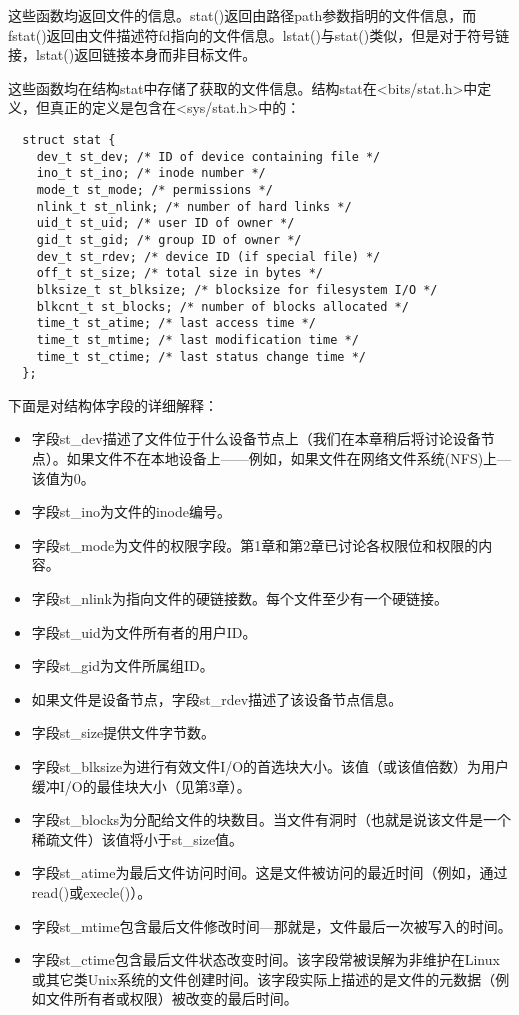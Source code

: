 这些函数均返回文件的信息。stat()返回由路径path参数指明的文件信息，而fstat()返回由文件描述符fd指向的文件信息。lstat()与stat()类似，但是对于符号链接，lstat()返回链接本身而非目标文件。

这些函数均在结构stat中存储了获取的文件信息。结构stat在<bits/stat.h>中定义，但真正的定义是包含在<sys/stat.h>中的：

\begin{lstlisting}
  struct stat {
    dev_t st_dev; /* ID of device containing file */
    ino_t st_ino; /* inode number */
    mode_t st_mode; /* permissions */
    nlink_t st_nlink; /* number of hard links */
    uid_t st_uid; /* user ID of owner */
    gid_t st_gid; /* group ID of owner */
    dev_t st_rdev; /* device ID (if special file) */
    off_t st_size; /* total size in bytes */
    blksize_t st_blksize; /* blocksize for filesystem I/O */
    blkcnt_t st_blocks; /* number of blocks allocated */
    time_t st_atime; /* last access time */
    time_t st_mtime; /* last modification time */
    time_t st_ctime; /* last status change time */
  };
\end{lstlisting}

下面是对结构体字段的详细解释：

\begin{itemize}
\item 字段st\_dev描述了文件位于什么设备节点上（我们在本章稍后将讨论设备节点）。如果文件不在本地设备上——例如，如果文件在网络文件系统(NFS)上—该值为0。
\item 字段st\_ino为文件的inode编号。
\item 字段st\_mode为文件的权限字段。第1章和第2章已讨论各权限位和权限的内容。
\item 字段st\_nlink为指向文件的硬链接数。每个文件至少有一个硬链接。
\item 字段st\_uid为文件所有者的用户ID。
\item 字段st\_gid为文件所属组ID。
\item 如果文件是设备节点，字段st\_rdev描述了该设备节点信息。
\item 字段st\_size提供文件字节数。
\item 字段st\_blksize为进行有效文件I/O的首选块大小。该值（或该值倍数）为用户缓冲I/O的最佳块大小（见第3章）。
\item 字段st\_blocks为分配给文件的块数目。当文件有洞时（也就是说该文件是一个稀疏文件）该值将小于st\_size值。
\item 字段st\_atime为最后文件访问时间。这是文件被访问的最近时间（例如，通过read()或execle()）。
\item 字段st\_mtime包含最后文件修改时间—那就是，文件最后一次被写入的时间。
\item 字段st\_ctime包含最后文件状态改变时间。该字段常被误解为非维护在Linux或其它类Unix系统的文件创建时间。该字段实际上描述的是文件的元数据（例如文件所有者或权限）被改变的最后时间。
\end{itemize}

